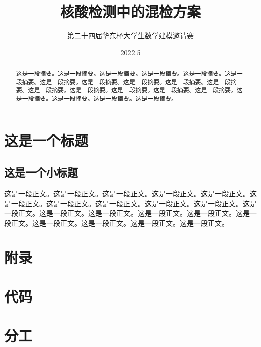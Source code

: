 \documentclass[12pt]{article}
\title{核酸检测中的混检方案}
\author{第二十四届华东杯大学生数学建模邀请赛}
\date{2022.5}
\begin{document}
\maketitle

\begin{abstract}
这是一段摘要。这是一段摘要。这是一段摘要。这是一段摘要。这是一段摘要。这是一段摘要。这是一段摘要。这是一段摘要。这是一段摘要。这是一段摘要。这是一段摘要。这是一段摘要。这是一段摘要。这是一段摘要。这是一段摘要。这是一段摘要。这是一段摘要。这是一段摘要。这是一段摘要。这是一段摘要。
\end{abstract}

\newpage

{\centering\section{这是一个标题}}

\subsection{这是一个小标题}
这是一段正文。这是一段正文。这是一段正文。这是一段正文。这是一段正文。这是一段正文。这是一段正文。这是一段正文。这是一段正文。这是一段正文。这是一段正文。这是一段正文。这是一段正文。这是一段正文。这是一段正文。这是一段正文。这是一段正文。这是一段正文。这是一段正文。这是一段正文。

\newpage
\appendix
{\centering\section*{附录}}
{\centering\section{代码}}
{\centering\section{分工}}
\end{document}
